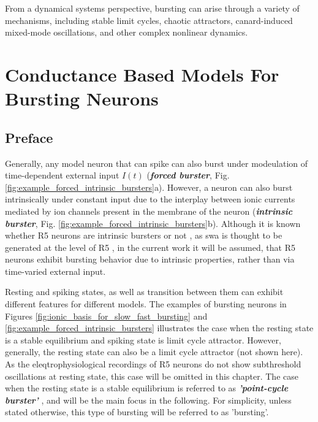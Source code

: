 \documentclass[../main.tex]{subfiles}
\begin{document}
\thispagestyle{empty}
\etocignoretoctocdepth %
\etocsettocstyle{\subsection*{\contentsname}}{}
\localtableofcontents
\newpage
\setcounter{page}{1}

\color{red}

From a dynamical systems perspective, bursting can arise through a variety of
mechanisms, including stable limit cycles, chaotic attractors, canard-induced
mixed-mode oscillations, and other complex nonlinear dynamics.

\color{black}

\section{Conductance Based Models For Bursting Neurons}

\subsection{Preface}

Generally, any model neuron that can spike can also burst under modeulation of
time-dependent external input $I(t)$ \cite{izhikevichDynamicalSystemsNeuroscience2006}
(\textbf{\textit{forced burster}}, Fig. \ref{fig:example_forced_intrinsic_bursters}a).
However, a neuron can also burst intrinsically under constant input due to the interplay
between ionic currents mediated by ion channels present in the membrane of the neuron
(\textbf{\textit{intrinsic burster}}, Fig. \ref{fig:example_forced_intrinsic_bursters}b).
Although it is known whether R5 neurons are intrinsic bursters or not
\cite{raccugliaNetworkSpecificSynchronizationElectrical2019}, as \gls{swa}
is thought to be generated at the level of R5 \cite{raccugliaNetworkSpecificSynchronizationElectrical2019},
in the current work it will be assumed, that R5 neurons exhibit bursting behavior
due to intrinsic properties, rather than via time-varied external input.

Resting and spiking states, as well as transition between them can exhibit different
features for different models. The examples of bursting neurons in Figures
\ref{fig:ionic_basis_for_slow_fast_bursting}
and \ref{fig:example_forced_intrinsic_bursters} illustrates the case when the resting
state is a stable equilibrium and spiking state is limit cycle attractor. However,
generally, the resting state can also be a limit cycle attractor (not shown here).
As the eleqtrophysiological recordings of R5 neurons do not show subthreshold oscillations
at resting state, this case will be omitted in this chapter. The case when the resting state
is a stable equilibrium is referred to as \textbf{\textit{'point-cycle burster'}}
\cite{izhikevichNEURALEXCITABILITYSPIKING2000}, and will be the main focus in the following.
For simplicity, unless stated otherwise, this type of bursting will be referred to as 'bursting'.
\end{document}
